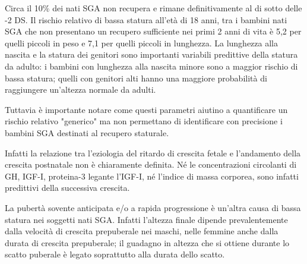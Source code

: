 Circa il 10\% dei nati SGA non recupera e rimane definitivamente al di sotto delle -2 DS.
Il rischio relativo di bassa statura all'età di 18 anni, tra i bambini nati SGA
che non presentano un recupero sufficiente nei primi 2 anni di vita è 5,2 per quelli 
piccoli in peso e 7,1 per quelli piccoli in lunghezza.
La lunghezza alla nascita e la statura dei genitori sono importanti variabili predittive della statura da 
adulto: i bambini con lunghezza alla nascita minore sono a maggior rischio di bassa statura;
quelli con genitori alti hanno una maggiore probabilità di raggiungere
un'altezza normale da adulti.\cite{cianfarani2006hormonal}

Tuttavia è importante notare come questi parametri aiutino a quantificare un 
rischio relativo "generico" ma non permettano di identificare con precisione 
i bambini SGA destinati al recupero staturale.

Infatti la relazione tra l'eziologia del ritardo di crescita fetale e l'andamento della 
crescita postnatale non è chiaramente definita.
Né le concentrazioni circolanti di GH, IGF-I, proteina-3 legante l'IGF-I, n\'e l'indice
di massa corporea, sono infatti predittivi della successiva crescita.\cite{consensus}

La pubertà sovente anticipata e/o a rapida progressione è un'altra causa di bassa statura nei soggetti nati SGA. Infatti l'altezza finale dipende prevalentemente dalla velocità di crescita prepuberale nei maschi, nelle femmine anche dalla durata di crescita prepuberale; il guadagno in altezza che si ottiene durante lo scatto puberale è legato soprattutto alla durata dello scatto\cite{gasser1985human}.

